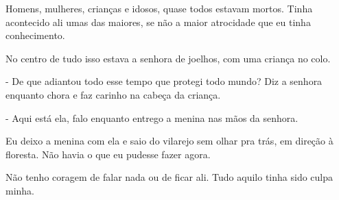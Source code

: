 Homens, mulheres, crianças e idosos, quase todos estavam mortos. Tinha acontecido ali umas das maiores, se não a maior atrocidade que eu tinha conhecimento.

No centro de tudo isso estava a senhora de joelhos, com uma criança no colo.

- De que adiantou todo esse tempo que protegi todo mundo? Diz a senhora enquanto chora e faz carinho na cabeça da criança.

- Aqui está ela, falo enquanto entrego a menina nas mãos da senhora.

Eu deixo a menina com ela e saio do vilarejo sem olhar pra trás, em direção à floresta. Não havia o que eu pudesse fazer agora.

Não tenho coragem de falar nada ou de ficar ali. Tudo aquilo tinha sido culpa minha.


